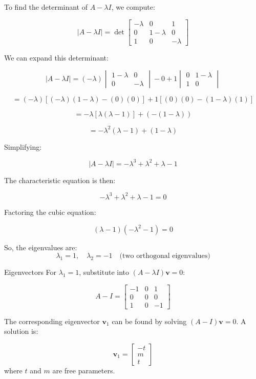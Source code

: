 \documentclass{article}
\begin{document}
To find the determinant of \( A - \lambda I \), we compute:

\[
|A - \lambda I| = \det\begin{bmatrix}
    -\lambda & 0 & 1 \\
    0 & 1 - \lambda & 0 \\
    1 & 0 & -\lambda
\end{bmatrix}
\]

We can expand this determinant:

\[
|A - \lambda I| = (-\lambda) \begin{vmatrix} 1-\lambda & 0 \\ 0 & -\lambda \end{vmatrix} - 0 + 1 \begin{vmatrix} 0 & 1-\lambda \\ 1 & 0 \end{vmatrix}
\]

\[
= (-\lambda)\left[(-\lambda)(1-\lambda) - (0)(0)\right] + 1 \left[ (0)(0) - (1-\lambda)(1) \right]
\]

\[
= -\lambda \left[ \lambda(\lambda - 1) \right] + (-(1-\lambda))
\]

\[
= -\lambda^2 (\lambda - 1) + (1 - \lambda)
\]

Simplifying:

\[
|A - \lambda I| = -\lambda^3 + \lambda^2 + \lambda - 1
\]

The characteristic equation is then:

\[
-\lambda^3 + \lambda^2 + \lambda - 1 = 0
\]

Factoring the cubic equation:

\[
(\lambda - 1)(-\lambda^2 - 1) = 0
\]

So, the eigenvalues are:
\[
\lambda_1 = 1, \quad \lambda_2 = -1 \quad \text{(two orthogonal eigenvalues)}
\]

Eigenvectors
For \( \lambda_1 = 1 \), substitute into \( (A - \lambda I)\mathbf{v} = 0 \):

\[
A - I = \begin{bmatrix}
    -1 & 0 & 1 \\
    0 & 0 & 0 \\
    1 & 0 & -1
\end{bmatrix}
\]

The corresponding eigenvector \( \mathbf{v}_1 \) can be found by solving \( (A - I) \mathbf{v} = 0 \). A solution is:

\[
\mathbf{v}_1 = \begin{bmatrix}
    -t \\
    m \\
    t
\end{bmatrix}
\]
where \( t \) and \( m \) are free parameters.
\end{document}
